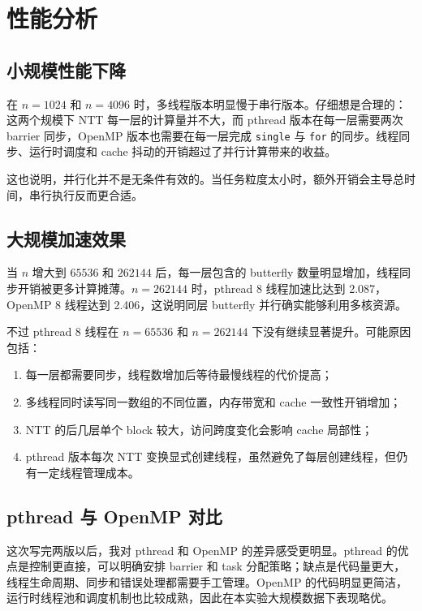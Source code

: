 \documentclass[a4paper,12pt]{ctexart}
\begin{document}
\section{性能分析}

\subsection{小规模性能下降}

在 $n=1024$ 和 $n=4096$ 时，多线程版本明显慢于串行版本。仔细想是合理的：这两个规模下 NTT 每一层的计算量并不大，而 pthread 版本在每一层需要两次 barrier 同步，OpenMP 版本也需要在每一层完成 \texttt{single} 与 \texttt{for} 的同步。线程同步、运行时调度和 cache 抖动的开销超过了并行计算带来的收益。

这也说明，并行化并不是无条件有效的。当任务粒度太小时，额外开销会主导总时间，串行执行反而更合适。

\subsection{大规模加速效果}

当 $n$ 增大到 $65536$ 和 $262144$ 后，每一层包含的 butterfly 数量明显增加，线程同步开销被更多计算摊薄。$n=262144$ 时，pthread 8 线程加速比达到 2.087，OpenMP 8 线程达到 2.406，这说明同层 butterfly 并行确实能够利用多核资源。

不过 pthread 8 线程在 $n=65536$ 和 $n=262144$ 下没有继续显著提升。可能原因包括：
\begin{enumerate}
  \item 每一层都需要同步，线程数增加后等待最慢线程的代价提高；
  \item 多线程同时读写同一数组的不同位置，内存带宽和 cache 一致性开销增加；
  \item NTT 的后几层单个 block 较大，访问跨度变化会影响 cache 局部性；
  \item pthread 版本每次 NTT 变换显式创建线程，虽然避免了每层创建线程，但仍有一定线程管理成本。
\end{enumerate}

\subsection{pthread 与 OpenMP 对比}

这次写完两版以后，我对 pthread 和 OpenMP 的差异感受更明显。pthread 的优点是控制更直接，可以明确安排 barrier 和 task 分配策略；缺点是代码量更大，线程生命周期、同步和错误处理都需要手工管理。OpenMP 的代码明显更简洁，运行时线程池和调度机制也比较成熟，因此在本实验大规模数据下表现略优。
\end{document}

